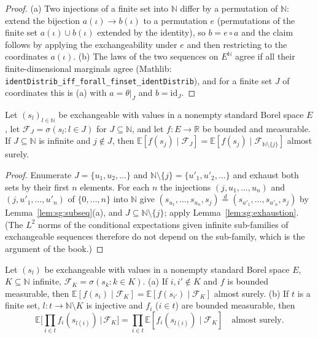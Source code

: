 \begin{proof}
  \leanok
(a) Two injections of a finite set into $\mathbb N$ differ by a permutation of $\mathbb N$: extend the bijection $a(\iota)\to b(\iota)$ to a permutation $e$ (permutations of the finite set $a(\iota)\cup b(\iota)$ extended by the identity),
so $b=e\circ a$ and the claim follows by applying the exchangeability under $e$ and then restricting to the coordinates $a(\iota)$. (b) The laws of the two sequences on $E^{\mathbb N}$ agree if all their finite-dimensional marginals
agree (Mathlib: \texttt{identDistrib\_iff\_forall\_finset\_identDistrib}), and for a finite set $J$ of coordinates this is (a) with $a=\theta|_J$ and $b=\mathrm{id}_J$.
\end{proof}

\begin{lemma}\label{lem:sg:lemma15}
  \leanok
Let $(s_l)_{l\in\mathbb N}$ be exchangeable with values in a nonempty standard Borel space $E$, let $\mathscr F_J=\sigma(s_l:l\in J)$ for $J\subseteq\mathbb N$, and let $f:E\to\mathbb R$ be bounded and measurable.
If $J\subseteq\mathbb N$ is infinite and $j\notin J$, then $\mathbb E[f(s_j)\mid\mathscr F_J]=\mathbb E[f(s_j)\mid\mathscr F_{\mathbb N\setminus\{j\}}]$ almost surely.
\end{lemma}

\begin{proof}
  \leanok
{}
Enumerate $J=\{u_1,u_2,\dots\}$ and $\mathbb N\setminus\{j\}=\{u'_1,u'_2,\dots\}$ and exhaust both sets by their first $n$ elements. For each $n$ the injections $(j,u_1,\dots,u_n)$ and $(j,u'_1,\dots,u'_n)$ of $\{0,\dots,n\}$ into $\mathbb N$ give
$(s_{u_1},\dots,s_{u_n},s_j)\overset d=(s_{u'_1},\dots,s_{u'_n},s_j)$ by Lemma~\ref{lem:sg:subseq}(a), and $J\subseteq\mathbb N\setminus\{j\}$; apply Lemma~\ref{lem:sg:exhaustion}. (The $L^2$ norms of the conditional expectations given infinite sub-families of exchangeable sequences
therefore do not depend on the sub-family, which is the argument of the book.)
\end{proof}

\begin{theorem}\label{thm:sg:cond-indep}
  \leanok
Let $(s_l)$ be exchangeable with values in a nonempty standard Borel space $E$, $K\subseteq\mathbb N$ infinite, $\mathscr F_K=\sigma(s_k:k\in K)$. (a) If $i,i'\notin K$ and $f$ is bounded measurable, then
$\mathbb E[f(s_i)\mid\mathscr F_K]=\mathbb E[f(s_{i'})\mid\mathscr F_K]$ almost surely. (b) If $t$ is a finite set, $l:t\to\mathbb N\setminus K$ is injective and $f_i$ ($i\in t$) are bounded measurable, then
\[\mathbb E\Big[\prod_{i\in t}f_i(s_{l(i)})\,\Big|\,\mathscr F_K\Big]=\prod_{i\in t}\mathbb E[f_i(s_{l(i)})\mid\mathscr F_K]\quad\text{almost surely.}\]
\end{theorem}

